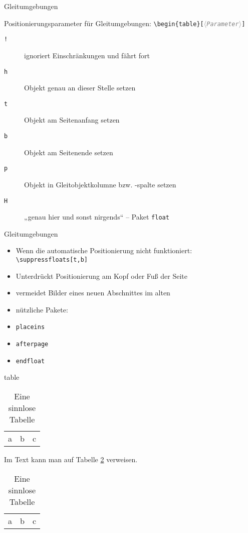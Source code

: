 \documentclass{beamer}
\newcommand{\meta}[1]{\textcolor{gray}{$\langle$\texttt{\textsl{#1}}$\rangle$}}
\begin{document}
\begin{frame}[fragile]{Gleitumgebungen}
\begin{block}{Positionierungsparameter für Gleitumgebungen:} 
\verb|\begin{table}[|\meta{Parameter}\verb|]|
\\
\begin{description}
\item[\texttt{!}] ignoriert Einschränkungen und fährt fort 
\item[\texttt{h}] Objekt genau an dieser Stelle setzen
\item[\texttt{t}] Objekt am Seitenanfang setzen
\item[\texttt{b}] Objekt am Seitenende setzen
\item[\texttt{p}] Objekt in Gleitobjektkolumne bzw. -spalte setzen
\item[\texttt{H}] „genau hier und sonst nirgends“ – Paket \verb|float|
\end{description}
\end{block}
\end{frame}

\begin{frame}[fragile]{Gleitumgebungen}
\begin{itemize}
\item Wenn die automatische Positionierung nicht funktioniert:\\%
\verb|\suppressfloats[t,b]|\\
\item Unterdrückt Positionierung am Kopf oder Fuß der Seite
\item vermeidet Bilder eines neuen Abschnittes im alten
\item nützliche Pakete:
\item \verb|placeins|
\item \verb|afterpage|
\item \verb|endfloat|
\end{itemize}
\end{frame}

\begin{frame}[fragile]{table}
\begin{LTXexample}
\begin{table}
\begin{tabular}{ccc}
a & b & c
\end{tabular}
\caption{Eine sinnlose Tabelle}
\label{tab:sinnlos}
\end{table}
Im Text kann man auf Tabelle
\ref{tab:sinnlos} verweisen.
\end{LTXexample}
\begin{table}
\begin{tabular}{ccc}
a & b & c
\end{tabular}
\caption{Eine sinnlose Tabelle}
\label{tab:sinnlos}
\end{table}
\end{frame}
\end{document}
